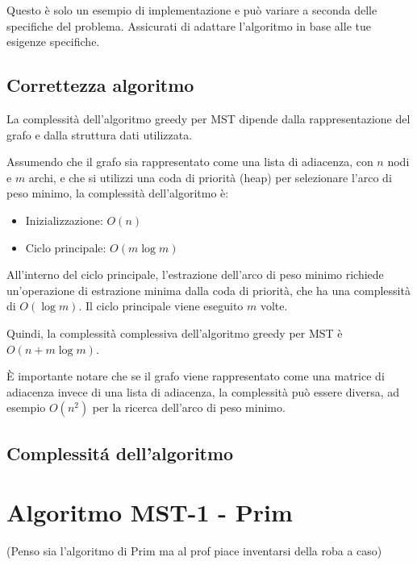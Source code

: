 Questo è solo un esempio di implementazione e può variare a seconda delle specifiche del problema. Assicurati di adattare l'algoritmo in base alle tue esigenze specifiche.

\subsection{Correttezza algoritmo}


La complessità dell'algoritmo greedy per MST dipende dalla rappresentazione del grafo e dalla struttura dati utilizzata.

Assumendo che il grafo sia rappresentato come una lista di adiacenza, con $n$ nodi e $m$ archi, e che si utilizzi una coda di priorità (heap) per selezionare l'arco di peso minimo, la complessità dell'algoritmo è:

\begin{itemize}
    \item Inizializzazione: $O(n)$
    \item Ciclo principale: $O(m \log m)$
\end{itemize}

All'interno del ciclo principale, l'estrazione dell'arco di peso minimo richiede un'operazione di estrazione minima dalla coda di priorità, che ha una complessità di $O(\log m)$. Il ciclo principale viene eseguito $m$ volte.

Quindi, la complessità complessiva dell'algoritmo greedy per MST è $O(n + m \log m)$.

È importante notare che se il grafo viene rappresentato come una matrice di adiacenza invece di una lista di adiacenza, la complessità può essere diversa, ad esempio $O(n^2)$ per la ricerca dell'arco di peso minimo.
\subsection{Complessit\'a dell'algoritmo}






\section{Algoritmo MST-1 - Prim}
(Penso sia l'algoritmo di Prim ma al prof piace inventarsi della roba a caso)

%

